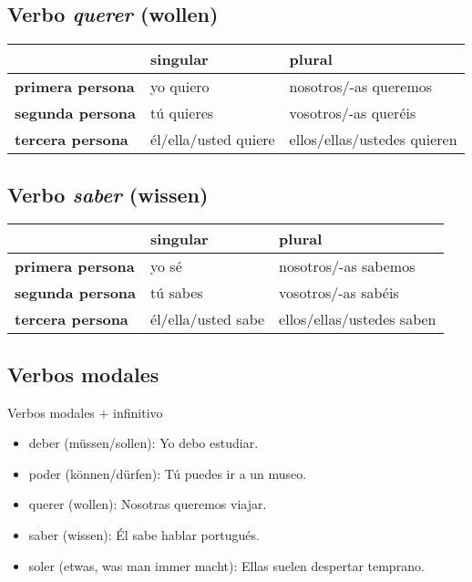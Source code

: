 \documentclass{article}
\begin{document}
	\subsection{Verbo \textit{querer} (wollen)}
	
	\begin{center}
		\begin{tabular}{l|l|l}
			& \textbf{singular} & \textbf{plural} \\
			\hline
			\textbf{primera persona} & yo quiero & nosotros/-as queremos \\
			\hline
			\textbf{segunda persona} & tú quieres & vosotros/-as queréis \\
			\hline
			\textbf{tercera persona} & él/ella/usted quiere &ellos/ellas/ustedes quieren
		\end{tabular}
	\end{center}

	\subsection{Verbo \textit{saber} (wissen)}
	
	\begin{center}
		\begin{tabular}{l|l|l}
			& \textbf{singular} & \textbf{plural} \\
			\hline
			\textbf{primera persona} & yo sé & nosotros/-as sabemos \\
			\hline
			\textbf{segunda persona} & tú sabes & vosotros/-as sabéis \\
			\hline
			\textbf{tercera persona} & él/ella/usted sabe &ellos/ellas/ustedes saben
		\end{tabular}
	\end{center}

	\subsection{Verbos modales}
	Verbos modales + infinitivo
	\begin{itemize}
		\item deber (müssen/sollen): Yo debo estudiar.
		\item poder (können/dürfen): Tú puedes ir a un museo.
		\item querer (wollen): Nosotras queremos viajar.
		\item saber (wissen): Él sabe hablar portugués.
		\item soler (etwas, was man immer macht): Ellas suelen despertar temprano.
	\end{itemize}
\end{document}
